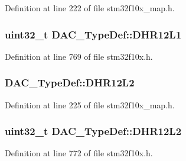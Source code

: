Definition at line 222 of file stm32f10x\+\_\+map.\+h.

\subsubsection[{\texorpdfstring{D\+H\+R12\+L1}{DHR12L1}}]{ {\bf uint32\+\_\+t} D\+A\+C\+\_\+\+Type\+Def\+::\+D\+H\+R12\+L1}\hypertarget{struct_d_a_c___type_def_a5eb63912e39085e3e13d64bdb0cf38bd}{}\label{struct_d_a_c___type_def_a5eb63912e39085e3e13d64bdb0cf38bd}


Definition at line 769 of file stm32f10x.\+h.

\subsubsection[{\texorpdfstring{D\+H\+R12\+L2}{DHR12L2}}]{ D\+A\+C\+\_\+\+Type\+Def\+::\+D\+H\+R12\+L2}\hypertarget{struct_d_a_c___type_def_a020874642baaeedd60c3534d070f8819}{}\label{struct_d_a_c___type_def_a020874642baaeedd60c3534d070f8819}


Definition at line 225 of file stm32f10x\+\_\+map.\+h.

\subsubsection[{\texorpdfstring{D\+H\+R12\+L2}{DHR12L2}}]{ {\bf uint32\+\_\+t} D\+A\+C\+\_\+\+Type\+Def\+::\+D\+H\+R12\+L2}\hypertarget{struct_d_a_c___type_def_a9f612b6b3e065e810e5a2fb254d6a40b}{}\label{struct_d_a_c___type_def_a9f612b6b3e065e810e5a2fb254d6a40b}


Definition at line 772 of file stm32f10x.\+h.

